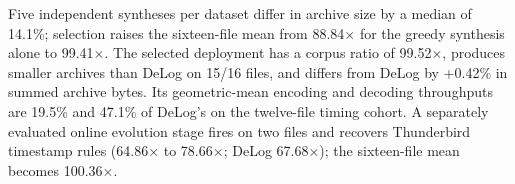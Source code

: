Five independent syntheses per dataset differ in archive size by a median of 14.1\%; selection raises the sixteen-file mean from 88.84$\times$ for the greedy synthesis alone to 99.41$\times$. The selected deployment has a corpus ratio of 99.52$\times$, produces smaller archives than DeLog on 15/16 files, and differs from DeLog by +0.42\% in summed archive bytes. Its geometric-mean encoding and decoding throughputs are 19.5\% and 47.1\% of DeLog's on the twelve-file timing cohort. A separately evaluated online evolution stage fires on two files and recovers Thunderbird timestamp rules (64.86$\times$ to 78.66$\times$; DeLog 67.68$\times$); the sixteen-file mean becomes 100.36$\times$.
